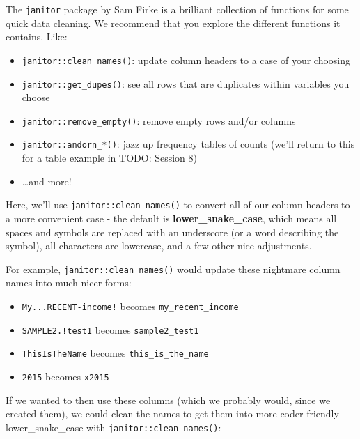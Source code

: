 \documentclass[]{book}
\newenvironment{Shaded}{\begin{snugshade}}{\end{snugshade}}
\newcommand{\KeywordTok}[1]{\textcolor[rgb]{0.13,0.29,0.53}{\textbf{#1}}}
\newcommand{\NormalTok}[1]{#1}
\newcommand{\OperatorTok}[1]{\textcolor[rgb]{0.81,0.36,0.00}{\textbf{#1}}}
\newcommand{\StringTok}[1]{\textcolor[rgb]{0.31,0.60,0.02}{#1}}
\providecommand{\tightlist}{%
  \setlength{\itemsep}{0pt}\setlength{\parskip}{0pt}}
\begin{document}
The \texttt{janitor} package by Sam Firke is a brilliant collection of functions for some quick data cleaning. We recommend that you explore the different functions it contains. Like:

\begin{itemize}
\tightlist
\item
  \texttt{janitor::clean\_names()}: update column headers to a case of your choosing
\item
  \texttt{janitor::get\_dupes()}: see all rows that are duplicates within variables you choose
\item
  \texttt{janitor::remove\_empty()}: remove empty rows and/or columns
\item
  \texttt{janitor::andorn\_*()}: jazz up frequency tables of counts (we'll return to this for a table example in TODO: Session 8)
\item
  \ldots{}and more!
\end{itemize}

Here, we'll use \texttt{janitor::clean\_names()} to convert all of our column headers to a more convenient case - the default is \textbf{lower\_snake\_case}, which means all spaces and symbols are replaced with an underscore (or a word describing the symbol), all characters are lowercase, and a few other nice adjustments.

For example, \texttt{janitor::clean\_names()} would update these nightmare column names into much nicer forms:

\begin{itemize}
\tightlist
\item
  \texttt{My...RECENT-income!} becomes \texttt{my\_recent\_income}
\item
  \texttt{SAMPLE2.!test1} becomes \texttt{sample2\_test1}
\item
  \texttt{ThisIsTheName} becomes \texttt{this\_is\_the\_name}
\item
  \texttt{2015} becomes \texttt{x2015}
\end{itemize}

If we wanted to then use these columns (which we probably would, since we created them), we could clean the names to get them into more coder-friendly lower\_snake\_case with \texttt{janitor::clean\_names()}:

\begin{Shaded}
\end{Shaded}
\end{document}
